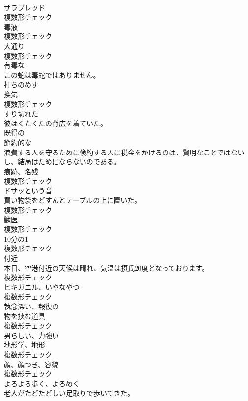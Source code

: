 \documentclass[8pt]{extreport}
\begin{document}
\begin{CJK}{UTF8}{min}
\\	[名詞]	サラブレッド	
\\	複数形チェック
\\	[名詞]	毒液	
\\	複数形チェック
\\	[名詞]	大通り	
\\	複数形チェック
\\	[形容詞]	有毒な	
\\	この蛇は毒蛇ではありません。	
\\	[動詞]	打ちのめす	
\\	[名詞]	換気	
\\	複数形チェック
\\	[形容詞]	すり切れた	
\\	彼はくたくたの背広を着ていた。	
\\	[形容詞]	既得の	
\\	[形容詞]	節約的な	
\\	浪費する人を守るために倹約する人に税金をかけるのは、賢明なことではないし、結局はためにならないのである。	
\\	[名詞]	痕跡、名残	
\\	複数形チェック
\\	[名詞]	ドサッという音	
\\	買い物袋をどすんとテーブルの上に置いた。	
\\	複数形チェック
\\	[名詞]	獣医	
\\	複数形チェック
\\	[名詞]	10分の1	
\\	複数形チェック
\\	[名詞]	付近	
\\	本日、空港付近の天候は晴れ、気温は摂氏20度となっております。	
\\	複数形チェック
\\	[名詞]	ヒキガエル、いやなやつ	
\\	複数形チェック
\\	[形容詞]	執念深い、報復の	
\\	[名詞]	物を挟む道具	
\\	複数形チェック
\\	[形容詞]	男らしい、力強い	
\\	[名詞]	地形学、地形	
\\	複数形チェック
\\	[名詞]	顔、顔つき、容貌	
\\	複数形チェック
\\	[動詞]	よろよろ歩く、よろめく	
\\	老人がたどたどしい足取りで歩いてきた。	

\end{CJK}
\end{document}
